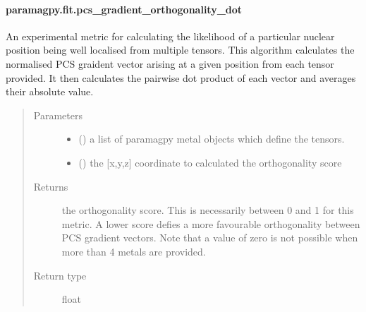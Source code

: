 \documentclass[a4paper,10pt,english,openany,oneside]{sphinxmanual}
\begin{document}
\paragraph{paramagpy.fit.pcs\_gradient\_orthogonality\_dot}
\label{\detokenize{reference/generated/paramagpy.fit.pcs_gradient_orthogonality_dot:paramagpy-fit-pcs-gradient-orthogonality-dot}}\label{\detokenize{reference/generated/paramagpy.fit.pcs_gradient_orthogonality_dot::doc}}

\begin{fulllineitems}
\label{\detokenize{reference/generated/paramagpy.fit.pcs_gradient_orthogonality_dot:paramagpy.fit.pcs_gradient_orthogonality_dot}}
\sphinxAtStartPar
An experimental metric for calculating the likelihood
of a particular nuclear position being well localised
from multiple tensors.
This algorithm calculates the normalised PCS graident
vector arising at a given position from each tensor
provided. It then calculates the pairwise dot product
of each vector and averages their absolute value.
\begin{quote}\begin{description}
\item[{Parameters}] \leavevmode\begin{itemize}
\item {} 
\sphinxAtStartPar
{} () \textendash{} a list of paramagpy metal objects which define the
tensors.

\item {} 
\sphinxAtStartPar
{} () \textendash{} the {[}x,y,z{]} coordinate to calculated the
orthogonality score

\end{itemize}

\item[{Returns}] \leavevmode
\sphinxAtStartPar
{} \textendash{} the orthogonality score. This is necessarily
between 0 and 1 for this metric. A lower
score defies a more favourable orthogonality
between PCS gradient vectors.
Note that a value of zero is not possible when
more than 4 metals are provided.

\item[{Return type}] \leavevmode
\sphinxAtStartPar
float

\end{description}\end{quote}

\end{fulllineitems}
\end{document}
